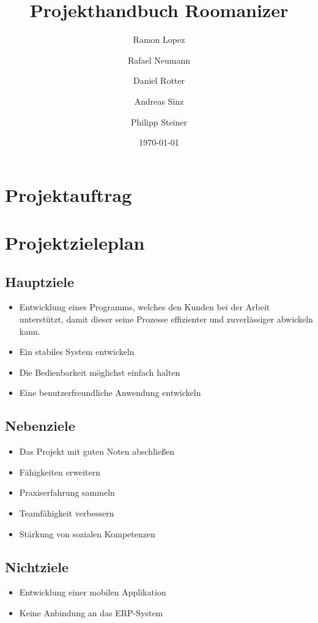 \documentclass[10pt,a4paper,titlepage]{article}
\begin{document}
\fancyhf{}

\lhead{\leftmark}

\title{Projekthandbuch Roomanizer}
\author{Ramon Lopez \and Rafael Neumann \and Daniel Rotter \and Andreas Sinz \and Philipp Steiner}
\date{\today}
\maketitle

\tableofcontents
\newpage

\section{Projektauftrag}
\newpage

\section{Projektzieleplan}
\subsection{Hauptziele}
\begin{itemize}
	\item Entwicklung eines Programms, welches den Kunden bei der Arbeit unterstützt, damit dieser seine Prozesse effizienter und zuverlässiger abwickeln kann.
	\item Ein stabiles System entwickeln
	\item Die Bedienbarkeit möglichst einfach halten
	\item Eine benutzerfreundliche Anwendung entwickeln
\end{itemize}
\subsection{Nebenziele}
\begin{itemize}
	\item Das Projekt mit guten Noten abschließen
	\item Fähigkeiten erweitern
	\item Praxiserfahrung sammeln
	\item Teamfähigkeit verbessern
	\item Stärkung von sozialen Kompetenzen
\end{itemize}
\subsection{Nichtziele}
\begin{itemize}
	\item Entwicklung einer mobilen Applikation
	\item Keine Anbindung an das ERP-System
\end{itemize}
\newpage
\end{document}
